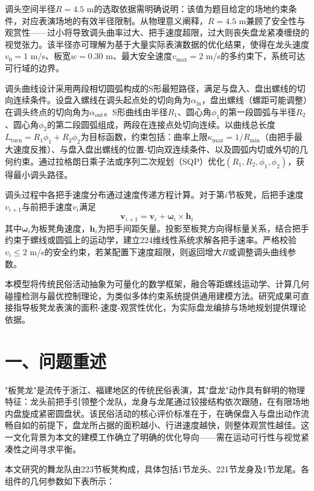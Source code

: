 \documentclass{mcmthesis}
\begin{document}
调头空间半径$R=4.5$ m的选取依据需明确说明：该值为题目给定的场地约束条件，对应表演场地的有效半径限制。从物理意义阐释，$R=4.5$ m兼顾了安全性与观赏性——过小将导致调头曲率过大、把手速度超限，过大则丧失盘龙紧凑缠绕的视觉张力。该半径亦可理解为基于大量实际表演数据的优化结果，使得在龙头速度$v_0=1$ m/s、板宽$w=0.30$ m、最大安全速度$v_{\max}=2$ m/s的多约束下，系统可达可行域的边界。

调头曲线设计采用两段相切圆弧构成的S形最短路径，满足与盘入、盘出螺线的切向连续条件。设盘入螺线在调头起点处的切向角为$\alpha_{\text{in}}$，盘出螺线（螺距可能调整）在调头终点的切向角为$\alpha_{\text{out}}$。S形曲线由半径$R_1$、圆心角$\phi_1$的第一段圆弧与半径$R_2$、圆心角$\phi_2$的第二段圆弧组成，两段在连接点处切向连续。以曲线总长度$L_{\text{turn}}=R_1\phi_1+R_2\phi_2$为目标函数，约束包括：曲率上限$\kappa_{\max}=1/R_{\min}$（由把手最大速度反推）、与盘入盘出螺线的位置-切向双连续条件、以及圆弧内切或外切的几何约束。通过拉格朗日乘子法或序列二次规划（SQP）优化$(R_1,R_2,\phi_1,\phi_2)$，获得最小调头路径。

调头过程中各把手速度分布通过速度传递方程计算。对于第$i$节板凳，后把手速度$v_{i+1}$与前把手速度$v_i$满足
\begin{equation}
\mathbf{v}_{i+1}=\mathbf{v}_i+\boldsymbol{\omega}_i\times\mathbf{h}_i
\end{equation}
其中$\boldsymbol{\omega}_i$为板凳角速度，$\mathbf{h}_i$为把手间距矢量。投影至板凳方向得标量关系，结合把手约束于螺线或圆弧上的运动学，建立224维线性系统求解各把手速率。严格校验$v_i\leq 2$ m/s的安全约束，若某配置下速度超限，则返回增大$R$或调整调头曲线参数。

本模型将传统民俗活动抽象为可量化的数学框架，融合等距螺线运动学、计算几何碰撞检测与最优控制理论，为类似多体约束系统提供通用建模方法。研究成果可直接指导板凳龙表演的面积-速度-观赏性优化，为实际盘龙编排与场地规划提供理论依据。


\section{ 一、问题重述}

"板凳龙"是流传于浙江、福建地区的传统民俗表演，其"盘龙"动作具有鲜明的物理特征：龙头前把手引领整个龙队，龙身与龙尾通过铰接结构依次跟随，在有限场地内盘旋成紧密圆盘状。该民俗活动的核心评价标准在于，在确保盘入与盘出动作流畅自如的前提下，盘龙所占据的面积越小、行进速度越快，则整体观赏性越佳。这一文化背景为本文的建模工作确立了明确的优化导向——需在运动可行性与视觉紧凑性之间寻求平衡。

本文研究的舞龙队由223节板凳构成，具体包括1节龙头、221节龙身及1节龙尾。各组件的几何参数如下表所示：
\end{document}
